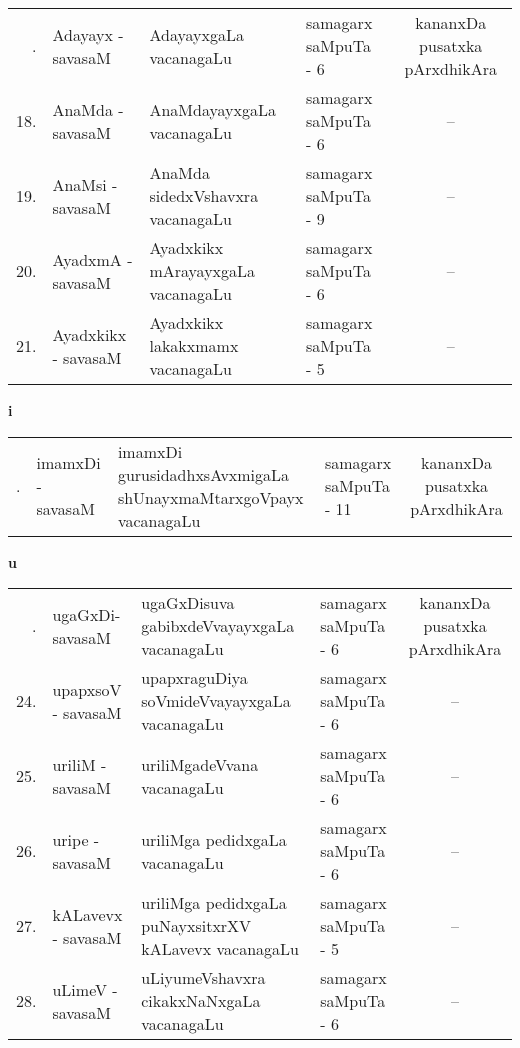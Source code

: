 {\renewcommand{\arraystretch}{1.35}
\begin{longtable}{rl>{\raggedright}p{5.5cm}lc}
\endfirsthead
\endhead
\endfoot
\endlastfoot
17. & Adayayx - savasaM & AdayayxgaLa vacanagaLu & samagarx saMpuTa - 6 & kananxDa pusatxka pArxdhikAra\\
18. & AnaMda - savasaM & AnaMdayayxgaLa vacanagaLu & samagarx saMpuTa - 6 & --\\
19. & AnaMsi - savasaM & AnaMda sidedxVshavxra vacanagaLu & samagarx saMpuTa - 9 & --\\
20. & AyadxmA - savasaM & Ayadxkikx mArayayxgaLa vacanagaLu & samagarx saMpuTa - 6 & --\\
21. & Ayadxkikx - savasaM & Ayadxkikx lakakxmamx vacanagaLu & samagarx saMpuTa - 5 & --\\
\end{longtable}}

\centerline{\bf i}

{\renewcommand{\arraystretch}{1.35}
\begin{longtable}{rl>{\raggedright}p{5.5cm}lc}
\endfirsthead
\endhead
\endfoot
\endlastfoot
22. & imamxDi - savasaM & imamxDi gurusidadhxsAvxmigaLa shUnayxmaMtarxgoVpayx vacanagaLu & samagarx saMpuTa - 11 & kananxDa pusatxka pArxdhikAra\\
\end{longtable}}


\bigskip

\centerline{\bf u}

\medskip

{\renewcommand{\arraystretch}{1.35}
\begin{longtable}{rl>{\raggedright}p{5.5cm}lc}
\endfirsthead
\endhead
\endfoot
\endlastfoot
23. &  ugaGxDi- savasaM & ugaGxDisuva gabibxdeVvayayxgaLa vacanagaLu & samagarx saMpuTa - 6  & kananxDa pusatxka pArxdhikAra\\
24. &  upapxsoV - savasaM & upapxraguDiya soVmideVvayayxgaLa vacanagaLu & samagarx saMpuTa - 6 & --\\
25. &  uriliM - savasaM & uriliMgadeVvana vacanagaLu & samagarx saMpuTa - 6 & --\\
26. &  uripe - savasaM & uriliMga pedidxgaLa vacanagaLu & samagarx saMpuTa - 6 & --\\
27. &  kALavevx - savasaM & uriliMga pedidxgaLa puNayxsitxrXV kALavevx vacanagaLu & samagarx saMpuTa - 5 & --\\
28. &  uLimeV - savasaM & uLiyumeVshavxra cikakxNaNxgaLa vacanagaLu & samagarx saMpuTa - 6  & --\\
\end{longtable}}
\bigskip

